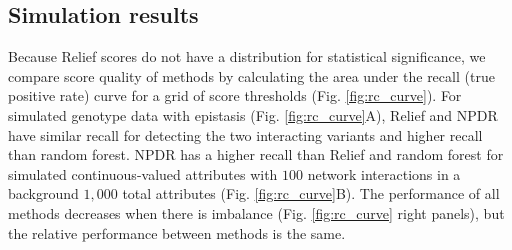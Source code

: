 \documentclass{bioinfo}
\begin{document}
\subsection{Simulation results} 





Because Relief scores do not have a distribution for statistical significance, we compare score quality of methods by calculating the area under the recall (true positive rate) curve for a grid of score thresholds (Fig. \ref{fig:rc_curve}). For simulated genotype data with epistasis (Fig. \ref{fig:rc_curve}A), Relief and NPDR have similar recall for detecting the two interacting variants and higher recall than random forest. NPDR has a higher recall than Relief and random forest for simulated continuous-valued attributes with $100$ network interactions in a background $1,000$ total attributes (Fig. \ref{fig:rc_curve}B). The performance of all methods decreases when there is imbalance (Fig. \ref{fig:rc_curve} right panels), but the relative performance between methods is the same.   
\end{document}
